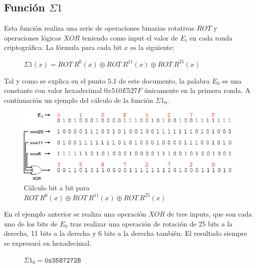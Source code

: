 \documentclass{article}
\begin{document}
    \subsection{Función $\Sigma1$}
        Esta función realiza una serie de operaciones binarias rotativas $ROT$ y operaciones lógicas $XOR$ teniendo como input el valor de $E_{i}$ en cada ronda criptográfica. La fórmula para cada bit $x$ es la siguiente:
            \begin{figure}[H]
            \centering
                $\Sigma1(x) = ROT \ R^{6}(x) \oplus ROT \ R^{11}(x) \oplus ROT \ R^{25}(x)$
            \end{figure}
        Tal y como se explica en el punto 5.1 de este documento, la palabra $E_{0}$ es una constante con valor hexadecimal $0x510E527F$ únicamente en la primera ronda. A continuación un ejemplo del cálculo de la función $\Sigma1_{0}$.
            \begin{figure}[H]
            \centering
                \includegraphics[scale=0.41]{img/SHA-256-function_Sigma1.png}
                \caption{Cálculo bit a bit para $ROT \ R^{6}(x) \oplus ROT \ R^{11}(x) \oplus ROT \ R^{25}(x)$}
            \end{figure}
        En el ejemplo anterior se realiza una operación $XOR$ de tres inputs, que son cada uno de los bits de $E_{0}$ tras realizar una operación de rotación de 25 bits a la derecha, 11 bits a la derecha y 6 bits a la derecha también. El resultado siempre se expresará en hexadecimal.
            \begin{figure}[H]
            \centering
                $\Sigma1_{0} = \texttt{0x3587272B}$
            \end{figure}
        
\end{document}
